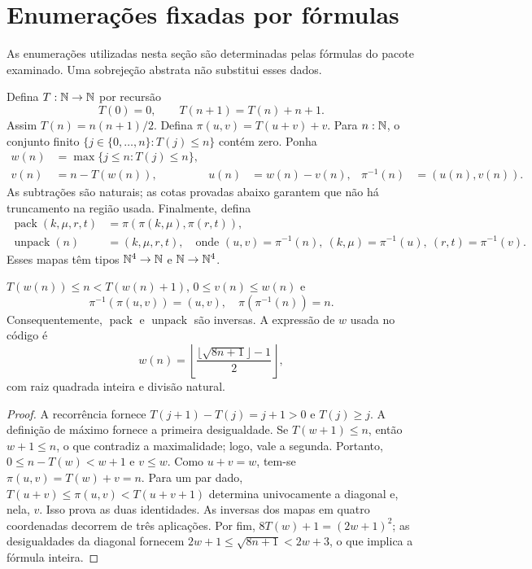 \section{Enumerações fixadas por fórmulas}
\label{normalizacao:sec:enumeration}

As enumerações utilizadas nesta seção são determinadas pelas fórmulas do
pacote examinado. Uma sobrejeção abstrata não substitui esses dados.

\begin{definicao}\label{map:normalizacao:4.1}
Defina $T:\mathbb N\to\mathbb N$ por recursão
\[
 T(0)=0,\qquad T(n+1)=T(n)+n+1.
\]
Assim $T(n)=n(n+1)/2$. Defina
$\pi(u,v)=T(u+v)+v$. Para $n:\mathbb N$, o conjunto finito
$\{j\in\{0,\ldots,n\}:T(j)\le n\}$ contém zero. Ponha
\begin{align*}
 w(n)&=\max\{j\le n:T(j)\le n\},\\
 v(n)&=n-T(w(n)),& u(n)&=w(n)-v(n),&
 \pi^{-1}(n)&=(u(n),v(n)).
\end{align*}
As subtrações são naturais; as cotas provadas abaixo garantem que não
há truncamento na região usada. Finalmente, defina
\begin{align*}
 \operatorname{pack}(k,\mu,r,t)&=\pi(\pi(k,\mu),\pi(r,t)),\\
 \operatorname{unpack}(n)&=(k,\mu,r,t),
 \quad\text{onde }(u,v)=\pi^{-1}(n),\ (k,\mu)=\pi^{-1}(u),\
 (r,t)=\pi^{-1}(v).
\end{align*}
Esses mapas têm tipos $\mathbb N^4\to\mathbb N$ e $\mathbb N\to\mathbb N^4$.
\end{definicao}

\begin{lema}[inversas do pareamento]\label{map:normalizacao:4.2}\label{normalizacao:lem:pair}
$T(w(n))\le n<T(w(n)+1)$, $0\le v(n)\le w(n)$ e
\[
 \pi^{-1}(\pi(u,v))=(u,v),\quad
 \pi(\pi^{-1}(n))=n.
\]
Consequentemente, $\operatorname{pack}$ e $\operatorname{unpack}$
são inversas. A expressão de $w$ usada no código é
\[
 w(n)=\left\lfloor
 \frac{\lfloor\sqrt{8n+1}\rfloor-1}{2}\right\rfloor,
\]
com raiz quadrada inteira  e divisão natural.
\end{lema}
\begin{proof}
A recorrência fornece $T(j+1)-T(j)=j+1>0$ e $T(j)\ge j$.
A definição de máximo fornece a primeira desigualdade. Se
$T(w+1)\le n$, então $w+1\le n$, o que contradiz a maximalidade;
logo, vale a segunda. Portanto, $0\le n-T(w)<w+1$ e $v\le w$.
Como $u+v=w$, tem-se $\pi(u,v)=T(w)+v=n$.
Para um par dado, $T(u+v)\le\pi(u,v)<T(u+v+1)$ determina
univocamente a diagonal e, nela, $v$. Isso prova as duas identidades.
As inversas dos mapas em quatro coordenadas decorrem de três aplicações.
Por fim, $8T(w)+1=(2w+1)^2$; as desigualdades da diagonal fornecem
$2w+1\le\sqrt{8n+1}<2w+3$, o que implica a fórmula inteira.
\end{proof}

